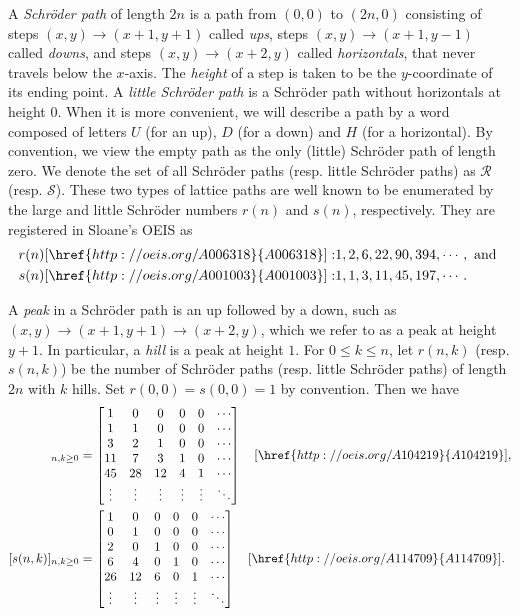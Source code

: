 \documentclass[11pt,reqno]{amsart}
\numberwithin{equation}{section}
\theoremstyle{plain}
\theoremstyle{definition}
\newcommand{\R}{\mathcal{R}}
\newcommand{\s}{\mathcal{S}}
\begin{document}
A \emph{Schr\"oder path} of length $2n$ is a path from $(0,0)$ to $(2n,0)$ consisting of steps $(x,y)\rightarrow(x+1,y+1)$ called \emph{ups}, steps $(x,y)\rightarrow(x+1,y-1)$ called \emph{downs}, and steps $(x,y)\rightarrow(x+2,y)$ called \emph{horizontals}, that never travels below the $x$-axis. The \emph{height} of a step is taken to be the $y$-coordinate of its ending point. A \emph{little Schr\"oder path} is a Schr\"oder path without horizontals at height $0$. When it is more convenient, we will describe a path by a word composed of letters $U$ (for an up), $D$ (for a down) and $H$ (for a horizontal). By convention, we view the empty path as the only (little) Schr\"oder path of length zero. We denote the set of all Schr\"oder paths (resp. little Schr\"oder paths) as $\R$ (resp. $\s$). These two types of lattice paths are well known to be enumerated by the large and little Schr\"oder numbers $r(n)$ and $s(n)$, respectively. They are registered in Sloane's OEIS \cite{oeis} as
\begin{align*}
r(n) [\href{http://oeis.org/A006318}{A006318}]:& 1,2,6,22,90,394,\cdots, \text{ and } \\
s(n) [\href{http://oeis.org/A001003}{A001003}]:& 1,1,3,11,45,197,\cdots.
\end{align*}



A \emph{peak} in a Schr\"oder path is an up followed by a down, such as $(x,y)\rightarrow(x+1,y+1)\rightarrow(x+2,y)$, which we refer to as a peak at height $y+1$. In particular, a \emph{hill} is a peak at height $1$. For $0\le k\le n$, let $r(n,k)$ (resp. $s(n,k)$) be the number of Schr\"oder paths (resp. little Schr\"oder paths) of length $2n$ with $k$ hills. Set $r(0,0)=s(0,0)=1$ by convention. Then we have
\begin{align}
[r(n,k)]_{n,k\ge 0} &=
\begin{bmatrix}\label{sch-tri}
1 & 0 & 0 & 0 & 0 & \cdots\\
1 & 1 & 0 & 0 & 0 & \cdots\\
3 & 2 & 1 & 0 & 0 & \cdots\\
11 & 7 & 3 & 1 & 0 & \cdots\\
45 & 28 & 12 & 4 & 1 & \cdots\\
\vdots & \vdots & \vdots & \vdots & \vdots & \ddots
\end{bmatrix} \quad [\href{http://oeis.org/A104219}{A104219}],\\
[s(n,k)]_{n,k\ge 0} &=
\begin{bmatrix}\label{littlesch-tri}
1 & 0 & 0 & 0 & 0 & \cdots\\
0 & 1 & 0 & 0 & 0 & \cdots\\
2 & 0 & 1 & 0 & 0 & \cdots\\
6 & 4 & 0 & 1 & 0 & \cdots\\
26 & 12 & 6 & 0 & 1 & \cdots\\
\vdots & \vdots & \vdots & \vdots & \vdots & \ddots
\end{bmatrix} \quad [\href{http://oeis.org/A114709}{A114709}].
\end{align}
\end{document}
